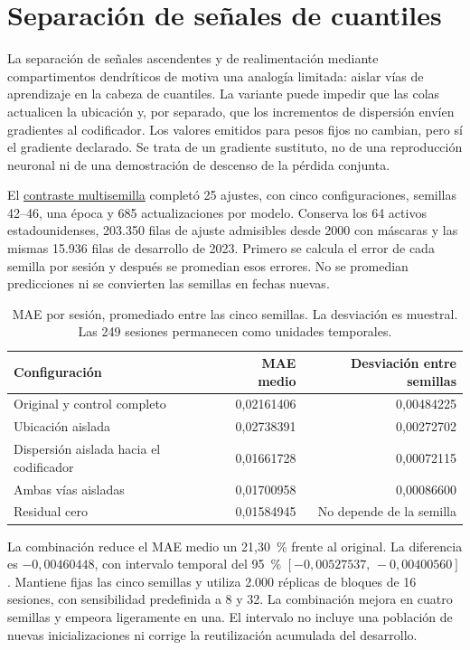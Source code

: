 \documentclass[11pt,a4paper]{report}
\begin{document}
\section{Separación de señales de cuantiles}
La separación de señales ascendentes y de realimentación mediante
compartimentos dendríticos de \textcite{guerguiev2017segregated} motiva una
analogía limitada: aislar vías de aprendizaje en la cabeza de cuantiles.
La variante puede impedir que las colas actualicen la ubicación y, por
separado, que los incrementos de dispersión envíen gradientes al codificador.
Los valores emitidos para pesos fijos no cambian, pero sí el gradiente
declarado. Se trata de un gradiente sustituto, no de una reproducción
neuronal ni de una demostración de descenso de la pérdida conjunta.

El \href{https://github.com/GonxKZ/mars-titan/blob/004fca53d/reports/research/quantile-multiseed-20261020/development-v1/README.md}{contraste multisemilla}
completó 25 ajustes, con cinco configuraciones, semillas 42--46, una época y
685 actualizaciones por modelo. Conserva los 64 activos estadounidenses,
203.350 filas de ajuste admisibles desde 2000 con máscaras y las mismas
15.936 filas de desarrollo de 2023. Primero se calcula el error de cada
semilla por sesión y después se promedian esos errores. No se promedian
predicciones ni se convierten las semillas en fechas nuevas.

\begin{table}[htbp]
\centering
\small
\begin{tabular}{lrr}
\toprule
Configuración & MAE medio & Desviación entre semillas \\
\midrule
Original y control completo & 0,02161406 & 0,00484225 \\
Ubicación aislada & 0,02738391 & 0,00272702 \\
Dispersión aislada hacia el codificador & 0,01661728 & 0,00072115 \\
Ambas vías aisladas & 0,01700958 & 0,00086600 \\
Residual cero & 0,01584945 & No depende de la semilla \\
\bottomrule
\end{tabular}
\caption{MAE por sesión, promediado entre las cinco semillas. La desviación
es muestral. Las 249 sesiones permanecen como unidades temporales.}
\end{table}

La combinación reduce el MAE medio un 21,30~\% frente al original.
La diferencia es $-0{,}00460448$, con intervalo temporal del 95~\%
$[-0{,}00527537,\,-0{,}00400560]$. Mantiene fijas las cinco semillas y utiliza
2.000 réplicas de bloques de 16 sesiones, con sensibilidad predefinida a 8 y
32. La combinación mejora en cuatro semillas y empeora ligeramente en una.
El intervalo no incluye una población de nuevas inicializaciones ni corrige
la reutilización acumulada del desarrollo.
\end{document}
